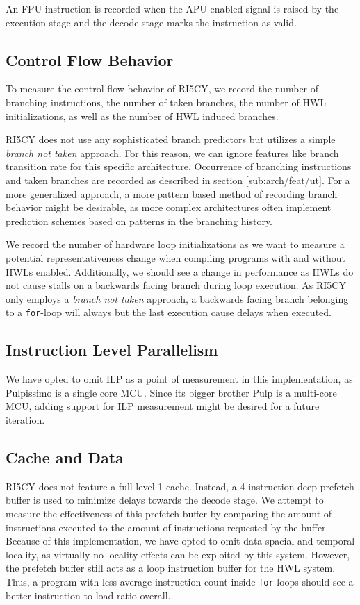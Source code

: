\documentclass[../bachelor_paper.tex]{subfiles}
\begin{document}
An \ac{FPU} instruction is recorded when the \ac{APU} enabled signal is raised by the execution stage and the decode stage marks the instruction as valid.

\subsection{Control Flow Behavior}
To measure the control flow behavior of RI5CY, we record the number of branching instructions, the number of taken branches, the number of \ac{HWL} initializations, as well as the number of \ac{HWL} induced branches.

RI5CY does not use any sophisticated branch predictors but utilizes a simple \emph{branch not taken} approach. For this reason, we can ignore features like branch transition rate \cite{haungsBranchTransitionRate2000} for this specific architecture. Occurrence of branching instructions and taken branches are recorded as described in section \ref{sub:arch/feat/ut}. For a more generalized approach, a more pattern based method of recording branch behavior might be desirable, as more complex architectures often implement prediction schemes based on patterns in the branching history.

We record the number of hardware loop initializations as we want to measure a potential representativeness change when compiling programs with and without \acp{HWL} enabled. Additionally, we should see a change in performance as \acp{HWL} do not cause stalls on a backwards facing branch during loop execution. As RI5CY only employs a \emph{branch not taken} approach, a backwards facing branch belonging to a \texttt{for}-loop will always but the last execution cause delays when executed.

\subsection{Instruction Level Parallelism}
We have opted to omit \ac{ILP} as a point of measurement in this implementation, as Pulpissimo is a single core \ac{MCU}. Since its bigger brother Pulp \cite{pulliniMrWolfEnergyPrecision2019} is a multi-core \ac{MCU}, adding support for \ac{ILP} measurement might be desired for a future iteration.

\subsection{Cache and Data}
RI5CY does not feature a full level 1 cache. Instead, a 4 instruction deep prefetch buffer is used to minimize delays towards the decode stage. We attempt to measure the effectiveness of this prefetch buffer by comparing the amount of instructions executed to the amount of instructions requested by the buffer. Because of this implementation, we have opted to omit data spacial and temporal locality, as virtually no locality effects can be exploited by this system. However, the prefetch buffer still acts as a loop instruction buffer for the \ac{HWL} system. Thus, a program with less average instruction count inside \texttt{for}-loops should see a better instruction to load ratio overall.
\end{document}
